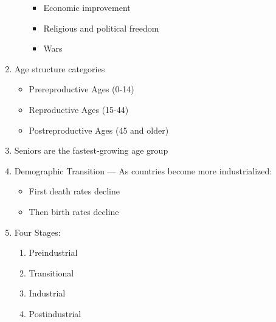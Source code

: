 \documentclass[12pt]{article}
\begin{document}
\begin{enumerate}
\begin{itemize}
        \begin{itemize}

          \item Economic improvement

          \item Religious and political freedom

          \item Wars

        \end{itemize}

    \end{itemize}

  \item Age structure categories

    \begin{itemize}

      \item Prereproductive Ages (0-14)

      \item Reproductive Ages (15-44)

      \item Postreproductive Ages (45 and older)

    \end{itemize}

  \item Seniors are the fastest-growing age group

  \item Demographic Transition — As countries become more industrialized:

    \begin{itemize}

      \item First death rates decline

      \item Then birth rates decline

    \end{itemize}

  \item Four Stages:

    \begin{enumerate}

      \item Preindustrial

      \item Transitional

      \item Industrial

      \item Postindustrial


\end{enumerate}
\end{enumerate}
\end{document}
